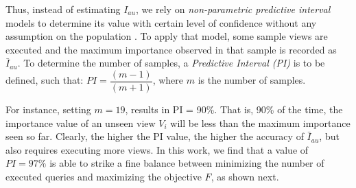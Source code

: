 Thus, instead of estimating $I_{au}$, we rely on {\em non-parametric predictive interval} models to determine its value with certain level of confidence without any assumption on the population \cite{Hu:2009:EAT:1516360.1516487}. 
%
To apply that model, some sample views are executed and the maximum importance observed in that sample is recorded as $\bar{I}_{au}$. 
%
To determine the number of samples, a {\em Predictive Interval (PI)} is to be defined, such that: 	
$PI= \dfrac{\left(m-1\right) }{\left(m + 1\right)}$, where $m$ is the number of samples. 
%

For instance, setting $m = 19$, results in PI = 90\%. 
%
That is, 90\% of the time, the importance value of an unseen view $V_i$ will be less than the maximum importance seen so far. 
%
Clearly, the higher the PI value, the higher the accuracy of $\bar{I}_{au}$, but also requires executing more views.  
%
In this work, we find that a value of $PI=97\%$ is able to strike a fine balance between minimizing the number of executed queries and maximizing the objective $F$, as shown next.


